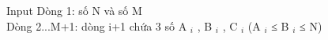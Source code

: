 Input
Dòng 1: số N và số M   
\\   Dòng 2...M+1: dòng i+1 chứa 3 số A   $_    i   $   , B   $_    i   $   , C   $_    i   $   (A   $_    i   $   ≤ B   $_    i   $   ≤ N)